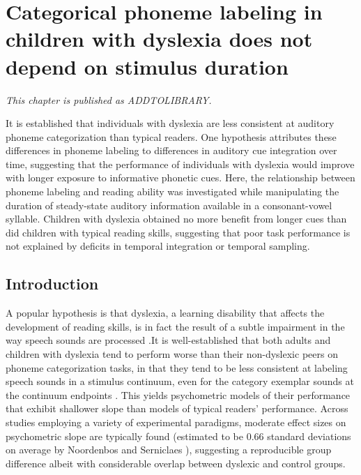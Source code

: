 \documentclass[../uwthesis.tex]{subfiles}
\begin{document}
\chapter{Categorical phoneme labeling in children with dyslexia does not depend on stimulus duration}
\emph{This chapter is published as ADDTOLIBRARY.}


It is established that individuals with dyslexia are less consistent at auditory phoneme categorization than typical readers. One hypothesis attributes these differences in phoneme labeling to differences in auditory cue integration over time, suggesting that the performance of individuals with dyslexia would improve with longer exposure to informative phonetic cues. Here, the relationship between phoneme labeling and reading ability was investigated while manipulating the duration of steady-state auditory information available in a consonant-vowel syllable. Children with dyslexia obtained no more benefit from longer cues than did children with typical reading skills, suggesting that poor task performance is not explained by deficits in temporal integration or temporal sampling.

\section{Introduction}
A popular hypothesis is that dyslexia, a learning disability that affects the development of reading skills, is in fact the result of a subtle impairment in the way speech sounds are processed \cite{Farmer1995TheReview,VanIngelghem2005AnDyslexia,Poelmans2011ReducedDyslexia,Tallal1980AuditoryChildren}.It is well-established that both adults and children with dyslexia tend to perform worse than their non-dyslexic peers on phoneme categorization tasks, in that they tend to be less consistent at labeling speech sounds in a stimulus continuum, even for the category exemplar sounds at the continuum endpoints \cite{Brandt1980AuditoryConsonants,Hakvoort2016TheDyslexia,OBrien2018ReadingCategorization,Serniclaes2004AllophonicDyslexia,Zhang2012UniversalityTones}. This yields psychometric models of their performance that exhibit shallower slope than models of typical readers' performance. Across studies employing a variety of experimental paradigms, moderate effect sizes on psychometric slope are typically found (estimated to be 0.66 standard deviations on average by Noordenbos and Serniclaes \cite{Noordenbos2015TheMeta-Analysis}), suggesting a reproducible group difference albeit with considerable overlap between dyslexic and control groups.
\end{document}
